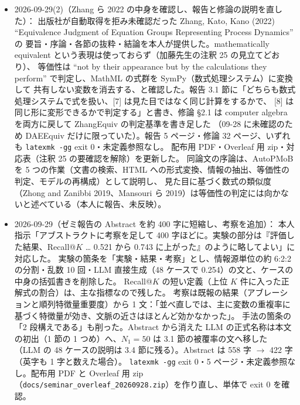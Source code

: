\documentclass[11pt,a4paper]{jsarticle}
\begin{document}
\begin{itemize}[nosep]
    断定できない（それを示すだけで論文になる）との指摘で削除した。\texttt{latexmk -gg} exit 0・5 ページ・未定義参照なし。
    配布用 PDF と Overleaf 用 zip（\texttt{docs/seminar\_overleaf\_20260929.zip}、単体で exit 0）を作った。
    修論第 2 章の同じ箇所は 09-29(4) で直した。
  \item 2026-09-29(2)（Zhang ら 2022 の中身を確認し、報告と修論の説明を直した）：
    出版社が自動取得を拒み未確認だった Zhang, Kato, Kano (2022) ``Equivalence Judgment of Equation Groups Representing Process Dynamics'' の
    要旨・序論・各節の抜粋・結論を本人が提供した。mathematically equivalent という表現は使っておらず（加藤先生の注釈 25 の見立てどおり）、
    等価性は ``not by their appearance but by the calculations they perform'' で判定し、MathML の式群を SymPy（数式処理システム）に変換して
    共有しない変数を消去する、と確認した。報告 3.1 節に「どちらも数式処理システムで式を扱い、[7] は見た目ではなく同じ計算をするかで、
    [8] は同じ形に変形できるかで判定する」と書き、修論 \S2.1 は computer algebra を両方に戻して ZhangEquiv の判定基準を書き足した
    （09-28 に未確認のため DAEEquiv だけに限っていた）。報告 5 ページ・修論 32 ページ、いずれも \texttt{latexmk -gg} exit 0・未定義参照なし。
    配布用 PDF・Overleaf 用 zip・対応表（注釈 25 の要確認を解除）を更新した。
    同論文の序論は、AutoPMoB を 5 つの作業（文書の検索、HTML への形式変換、情報の抽出、等価性の判定、モデルの再構成）として説明し、
    見た目に基づく数式の類似度（Zhong and Zanibbi 2019、Mansouri ら 2019）は等価性の判定には向かないと述べている（本人に報告、未反映）。
  \item 2026-09-29（ゼミ報告の Abstract を約 400 字に短縮し、考察を追加）：
    本人指示「アブストラクトに考察を足して 400 字ほどに。実験の部分は『評価した結果、Recall@$K$ … 0.521 から 0.743 に上がった』のように略してよい」に対応した。
    実験の箇条を「実験・結果・考察」とし、情報源単位の約 6:2:2 の分割・乱数 10 回・LLM 直接生成（48 ケースで 0.254）の文と、ケースの中身の括弧書きを削除した。
    Recall@$K$ の短い定義（上位 $K$ 件に入った正解式の割合）は、主な指標なので残した。
    考察は既報の結果（アブレーションと順列特徴量重要度）から 1 文：「並べ直しでは、主に変数の重複率に基づく特徴量が効き、文脈の近さはほとんど効かなかった」。
    手法の箇条の「2 段構えである」も削った。Abstract から消えた LLM の正式名称は本文の初出（1 節の 1 つめ）へ、$N_1 = 50$ は 3.1 節の被覆率の文へ移した
    （LLM の 48 ケースの説明は 3.4 節に残る）。Abstract は 558 字 $\to$ 422 字（英字も 1 字と数えた場合）。
    \texttt{latexmk -gg} exit 0・5 ページ・未定義参照なし。配布用 PDF と Overleaf 用 zip（\texttt{docs/seminar\_overleaf\_20260928.zip}）を作り直し、単体で exit 0 を確認。

\end{itemize}
\end{document}
